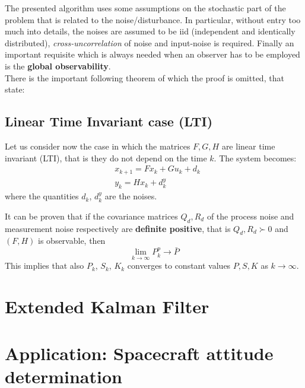 The presented algorithm uses some assumptions on the stochastic part of the problem that is related to the noise/disturbance. In particular, without entry too much into details, the noises are assumed to be iid (independent and identically distributed), \textit{cross-uncorrelation} of noise and input-noise is required. Finally an important requisite which is always needed when an observer has to be employed is the \textbf{global observability}. \\
There is the important following theorem of which the proof is omitted, that state:\\

\hspace*{-5mm}
%

\subsection{Linear Time Invariant case (LTI)}
Let us consider now the case in which the matrices $F, G, H$ are linear time invariant (LTI), that is they do not depend on the time $k$. The system becomes:
\begin{equation}
    \begin{aligned}
        &x_{k+1} = Fx_k + Gu_k + d_k\\
        &y_k = H x_k + d_k^y
    \end{aligned}
\end{equation}
where the quantities $d_k$, $d_k^y$ are the noises. 

It can be proven that if the covariance matrices $Q_d, R_d$ of the process noise and measurement noise respectively are \textbf{definite positive}, that is $Q_d, R_d \succ 0$ and $(F, H)$ is observable, then
\begin{equation*}
    \lim_{k\to\infty} P_k^p \to \bar{P}
\end{equation*}
This implies that also $P_k$, $S_k$, $K_k$ converges to constant values $P, S, K$ as $k\to\infty$. 
 
\section{Extended Kalman Filter}

\section{Application: Spacecraft attitude determination}




